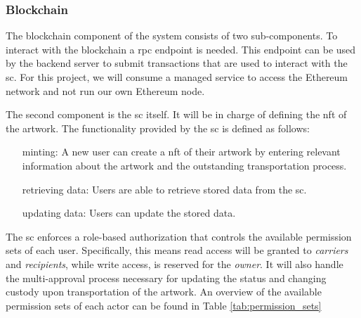 \subsubsection{Blockchain}
The blockchain component of the system consists of two sub-components. To interact with the blockchain a \gls{rpc} endpoint is needed. This endpoint can be used by the backend server to submit transactions that are used to interact with the \gls{sc}. For this project, we will consume a managed service to access the Ethereum network and not run our own Ethereum node.

The second component is the \gls{sc} itself. It will be in charge of defining the \gls{nft} of the artwork. 
The functionality provided by the \gls{sc} is defined as follows:

\begin{itemize}[align=left, font=\textit]
    \item[minting:] A new user can create a \gls{nft} of their artwork by entering relevant information about the artwork and the outstanding transportation process.
    \item[retrieving data:] Users are able to retrieve stored data from the \gls{sc}.
    \item[updating data:] Users can update the stored data.
\end{itemize}

The \gls{sc} enforces a role-based authorization that controls the available permission sets of each user. Specifically, this means read access will be granted to \textit{carriers} and \textit{recipients}, while write access, is reserved for the \textit{owner}. It will also handle the multi-approval process necessary for updating the status and changing custody upon transportation of the artwork. An overview of the available permission sets of each actor can be found in Table \ref{tab:permission_sets}

